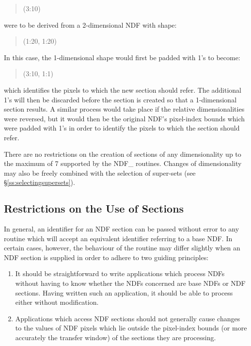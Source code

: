 \documentclass[twoside,11pt,nolof]{starlink}
\begin{document}
\small
\begin{quote}
\begin{center}
(3:10)
\end{center}
\end{quote}
\normalsize

were to be derived from a 2-dimensional NDF with shape:

\small
\begin{quote}
\begin{center}
(1:20, 1:20)
\end{center}
\end{quote}
\normalsize

In this case, the 1-dimensional shape would first be padded with 1's to
become:

\small
\begin{quote}
\begin{center}
(3:10, 1:1)
\end{center}
\end{quote}
\normalsize

which identifies the pixels to which the new section should refer.
The additional 1's will then be discarded before the section is created so
that a 1-dimensional section results.
A similar process would take place if the relative dimensionalities were
reversed, but it would then be the original NDF's pixel-index bounds which
were padded with 1's in order to identify the pixels to which the section
should refer.

There are no restrictions on the creation of sections of any dimensionality
up to the maximum of 7 supported by the NDF\_ routines.
Changes of dimensionality may also be freely combined with the selection of
super-sets (see \S\ref{ss:selectingsupersets}).

\subsection{\label{ss:sectionrestrictions}Restrictions on the Use of Sections}

In general, an identifier for an NDF section can be passed without error to
any routine which will accept an equivalent identifier referring to a base
NDF.
In certain cases, however, the behaviour of the routine may differ slightly
when an NDF section is supplied in order to adhere to two guiding
principles:

\begin{enumerate}

\item
It should be straightforward to write applications which process NDFs without
having to know whether the NDFs concerned are base NDFs or NDF sections.
Having written such an application, it should be able to process either without
modification.

\item
Applications which access NDF sections should not generally cause changes to the
values of NDF pixels which lie outside the pixel-index bounds (or more
accurately the transfer window) of the sections they are processing.

\end{enumerate}
\end{document}
